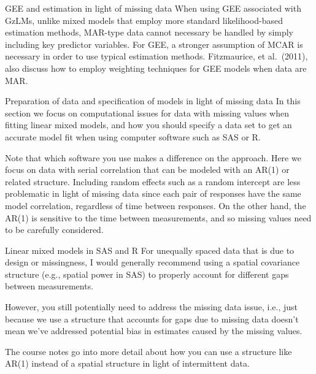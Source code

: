 \documentclass[
  9pt,
  ignorenonframetext,
]{beamer}
\begin{document}
\begin{frame}{GEE and estimation in light of missing data}
\protect\hypertarget{gee-and-estimation-in-light-of-missing-data}{}
When using GEE associated with GzLMs, unlike mixed models that employ
more standard likelihood-based estimation methods, MAR-type data cannot
necessary be handled by simply including key predictor variables. For
GEE, a stronger assumption of MCAR is necessary in order to use typical
estimation methods. Fitzmaurice, et al.~(2011), also discuss how to
employ weighting techniques for GEE models when data are MAR.
\end{frame}

\begin{frame}{Preparation of data and specification of models in light
of missing data}
\protect\hypertarget{preparation-of-data-and-specification-of-models-in-light-of-missing-data}{}
In this section we focus on computational issues for data with missing
values when fitting linear mixed models, and how you should specify a
data set to get an accurate model fit when using computer software such
as SAS or R.

Note that which software you use makes a difference on the approach.
Here we focus on data with serial correlation that can be modeled with
an AR(1) or related structure. Including random effects such as a random
intercept are less problematic in light of missing data since each pair
of responses have the same model correlation, regardless of time between
responses. On the other hand, the AR(1) is sensitive to the time between
measurements, and so missing values need to be carefully considered.
\end{frame}

\begin{frame}{Linear mixed models in SAS and R}
\protect\hypertarget{linear-mixed-models-in-sas-and-r}{}
For unequally spaced data that is due to design or missingness, I would
generally recommend using a spatial covariance structure (e.g., spatial
power in SAS) to properly account for different gaps between
measurements.

However, you still potentially need to address the missing data issue,
i.e., just because we use a structure that accounts for gaps due to
missing data doesn't mean we've addressed potential bias in estimates
caused by the missing values.

The course notes go into more detail about how you can use a structure
like AR(1) instead of a spatial structure in light of intermittent data.
\end{frame}
\end{document}
